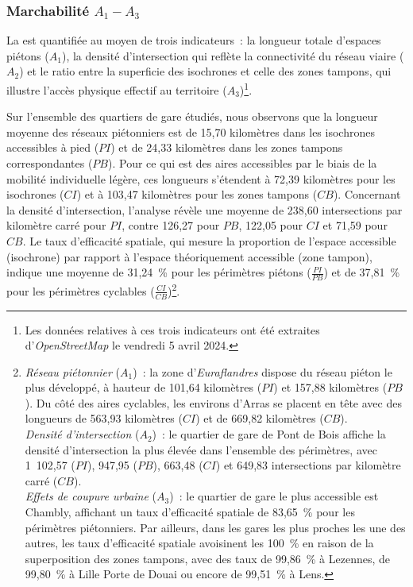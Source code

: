 \begin{refsegment}

\subsubsection*{Marchabilité \(A_{1} - A_{3}\)
    \label{chap6:indicateurs-accessibility-marchabilite}
    }

La  est quantifiée au moyen de trois indicateurs~: la longueur totale d'espaces piétons (\(A_{1}\)), la densité d'intersection qui reflète la connectivité du réseau viaire (\(A_{2}\)) et le ratio entre la superficie des isochrones et celle des zones tampons, qui illustre l'accès physique effectif au territoire (\(A_{3}\))\footnote{
    Les données relatives à ces trois indicateurs ont été extraites d'\textsl{OpenStreetMap} le vendredi 5 avril 2024.
}.%

Sur l'ensemble des quartiers de gare étudiés, nous observons que la longueur moyenne des réseaux piétonniers est de 15,70 kilomètres dans les isochrones accessibles à pied (\(PI\)) et de 24,33 kilomètres dans les zones tampons correspondantes (\(PB\)). Pour ce qui est des aires accessibles par le biais de la mobilité individuelle légère, ces longueurs s'étendent à 72,39 kilomètres pour les isochrones (\(CI\)) et à 103,47 kilomètres pour les zones tampons (\(CB\)). Concernant la densité d'intersection, l'analyse révèle une moyenne de 238,60 intersections par kilomètre carré pour \(PI\), contre 126,27 pour \(PB\), 122,05 pour \(CI\) et 71,59 pour \(CB\). Le taux d'efficacité spatiale, qui mesure la proportion de l'espace accessible (isochrone) par rapport à l'espace théoriquement accessible (zone tampon), indique une moyenne de 31,24~\% pour les périmètres piétons (\(\frac{PI}{PB}\)) et de 37,81~\% pour les périmètres cyclables (\(\frac{CI}{CB}\))\footnote{
    \textsl{Réseau piétonnier} (\(A_{1}\))~: la zone d'\textsl{Euraflandres} dispose du réseau piéton le plus développé, à hauteur de 101,64 kilomètres (\(PI\)) et 157,88 kilomètres (\(PB\)). Du côté des aires cyclables, les environs d'Arras se placent en tête avec des longueurs de 563,93 kilomètres (\(CI\)) et de 669,82 kilomètres (\(CB\)).
    \\
    \textsl{Densité d'intersection} (\(A_{2}\))~: le quartier de gare de Pont de Bois affiche la densité d'intersection la plus élevée dans l'ensemble des périmètres, avec 1~102,57 (\(PI\)), 947,95 (\(PB\)), 663,48 (\(CI\)) et 649,83 intersections par kilomètre carré (\(CB\)).
    \\
    \textsl{Effets de coupure urbaine} (\(A_{3}\))~: le quartier de gare le plus accessible est Chambly, affichant un taux d'efficacité spatiale de 83,65~\% pour les périmètres piétonniers. Par ailleurs, dans les gares les plus proches les une des autres, les taux d'efficacité spatiale avoisinent les 100~\% en raison de la superposition des zones tampons, avec des taux de 99,86~\% à Lezennes, de 99,80~\% à Lille Porte de Douai ou encore de 99,51~\% à Lens.
}.%


\end{refsegment}
